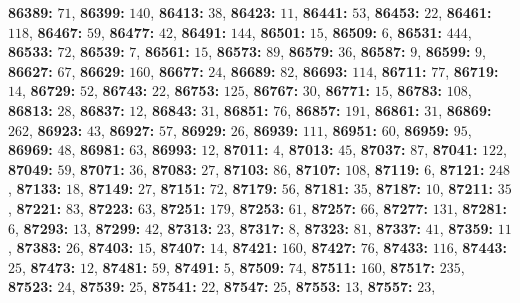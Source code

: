 \textsf{\bfseries 86389:} $71$, \textsf{\bfseries 86399:} $140$, \textsf{\bfseries 86413:} $38$, \textsf{\bfseries 86423:} $11$, \textsf{\bfseries 86441:} $53$, \textsf{\bfseries 86453:} $22$, \textsf{\bfseries 86461:} $118$, \textsf{\bfseries 86467:} $59$, \textsf{\bfseries 86477:} $42$, \textsf{\bfseries 86491:} $144$, \textsf{\bfseries 86501:} $15$, \textsf{\bfseries 86509:} $6$, \textsf{\bfseries 86531:} $444$, \textsf{\bfseries 86533:} $72$, \textsf{\bfseries 86539:} $7$, \textsf{\bfseries 86561:} $15$, \textsf{\bfseries 86573:} $89$, \textsf{\bfseries 86579:} $36$, \textsf{\bfseries 86587:} $9$, \textsf{\bfseries 86599:} $9$, \textsf{\bfseries 86627:} $67$, \textsf{\bfseries 86629:} $160$, \textsf{\bfseries 86677:} $24$, \textsf{\bfseries 86689:} $82$, \textsf{\bfseries 86693:} $114$, \textsf{\bfseries 86711:} $77$, \textsf{\bfseries 86719:} $14$, \textsf{\bfseries 86729:} $52$, \textsf{\bfseries 86743:} $22$, \textsf{\bfseries 86753:} $125$, \textsf{\bfseries 86767:} $30$, \textsf{\bfseries 86771:} $15$, \textsf{\bfseries 86783:} $108$, \textsf{\bfseries 86813:} $28$, \textsf{\bfseries 86837:} $12$, \textsf{\bfseries 86843:} $31$, \textsf{\bfseries 86851:} $76$, \textsf{\bfseries 86857:} $191$, \textsf{\bfseries 86861:} $31$, \textsf{\bfseries 86869:} $262$, \textsf{\bfseries 86923:} $43$, \textsf{\bfseries 86927:} $57$, \textsf{\bfseries 86929:} $26$, \textsf{\bfseries 86939:} $111$, \textsf{\bfseries 86951:} $60$, \textsf{\bfseries 86959:} $95$, \textsf{\bfseries 86969:} $48$, \textsf{\bfseries 86981:} $63$, \textsf{\bfseries 86993:} $12$, \textsf{\bfseries 87011:} $4$, \textsf{\bfseries 87013:} $45$, \textsf{\bfseries 87037:} $87$, \textsf{\bfseries 87041:} $122$, \textsf{\bfseries 87049:} $59$, \textsf{\bfseries 87071:} $36$, \textsf{\bfseries 87083:} $27$, \textsf{\bfseries 87103:} $86$, \textsf{\bfseries 87107:} $108$, \textsf{\bfseries 87119:} $6$, \textsf{\bfseries 87121:} $248$, \textsf{\bfseries 87133:} $18$, \textsf{\bfseries 87149:} $27$, \textsf{\bfseries 87151:} $72$, \textsf{\bfseries 87179:} $56$, \textsf{\bfseries 87181:} $35$, \textsf{\bfseries 87187:} $10$, \textsf{\bfseries 87211:} $35$, \textsf{\bfseries 87221:} $83$, \textsf{\bfseries 87223:} $63$, \textsf{\bfseries 87251:} $179$, \textsf{\bfseries 87253:} $61$, \textsf{\bfseries 87257:} $66$, \textsf{\bfseries 87277:} $131$, \textsf{\bfseries 87281:} $6$, \textsf{\bfseries 87293:} $13$, \textsf{\bfseries 87299:} $42$, \textsf{\bfseries 87313:} $23$, \textsf{\bfseries 87317:} $8$, \textsf{\bfseries 87323:} $81$, \textsf{\bfseries 87337:} $41$, \textsf{\bfseries 87359:} $11$, \textsf{\bfseries 87383:} $26$, \textsf{\bfseries 87403:} $15$, \textsf{\bfseries 87407:} $14$, \textsf{\bfseries 87421:} $160$, \textsf{\bfseries 87427:} $76$, \textsf{\bfseries 87433:} $116$, \textsf{\bfseries 87443:} $25$, \textsf{\bfseries 87473:} $12$, \textsf{\bfseries 87481:} $59$, \textsf{\bfseries 87491:} $5$, \textsf{\bfseries 87509:} $74$, \textsf{\bfseries 87511:} $160$, \textsf{\bfseries 87517:} $235$, \textsf{\bfseries 87523:} $24$, \textsf{\bfseries 87539:} $25$, \textsf{\bfseries 87541:} $22$, \textsf{\bfseries 87547:} $25$, \textsf{\bfseries 87553:} $13$, \textsf{\bfseries 87557:} $23$, 
